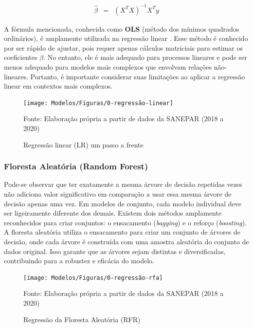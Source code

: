 \begin{eqnarray}
	\hat{\beta}&=&\left(X^T X\right)^{-1} X^T y\label{eq:ols}
\end{eqnarray}

A fórmula mencionada, conhecida como \textbf{OLS} (método dos mínimos quadrados ordinários), é amplamente utilizada na regressão linear . Esse método é conhecido por ser rápido de ajustar, pois requer apenas cálculos matriciais para estimar os coeficientes $\beta$. No entanto, ele é mais adequado para processos lineares e pode ser menos adequado para modelos mais complexos que envolvam relações não-lineares. Portanto, é importante considerar suas limitações ao aplicar a regressão linear em contextos mais complexos.

\begin{figure}[H]
	\centering
	\caption{Regressão linear (LR) um passo a frente}
	\label{fig:1-regressao-linear}
	\texttt{[image: Modelos/Figuras/0-regressão-linear]}
	
	Fonte: Elaboração própria a partir de dados da SANEPAR (2018 a 2020)
\end{figure}


\subsubsection{Floresta Aleat\'oria (Random Forest)} \label{subsubsec:rf}

Pode-se observar que ter exatamente a mesma árvore de decisão repetidas vezes não adiciona valor significativo em comparação a usar essa mesma árvore de decisão apenas uma vez. Em modelos de conjunto, cada modelo individual deve ser ligeiramente diferente dos demais. Existem dois métodos amplamente reconhecidos para criar conjuntos: o ensacamento (\textit{bagging}) e o reforço (\textit{boosting}). A floresta aleatória utiliza o ensacamento para criar um conjunto de árvores de decisão, onde cada árvore é construída com uma amostra aleatória do conjunto de dados original. Isso garante que as árvores sejam distintas e diversificadas, contribuindo para a robustez e eficácia do modelo.


\begin{figure}[H]
	\centering
	\caption{Regressão da Floresta Aleatória (RFR)}
	\label{fig:1-regressao-rfa}
	\texttt{[image: Modelos/Figuras/0-regressão-rfa]}
	
	Fonte: Elaboração própria a partir de dados da SANEPAR (2018 a 2020)
\end{figure}


